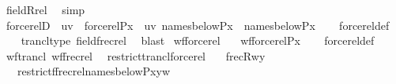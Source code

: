 \begin{isabellebody}
\ field{\isacharunderscore}{\kern0pt}Rrel\ \isamarkupfalse%
\ simp%
\endisatagproof
{\isafoldproof}%
%
\isadelimproof
\isanewline
%
\endisadelimproof
\isanewline
{}\isamarkupfalse%
\ forcerelD\ {\isacharcolon}{\kern0pt}\ {\isachardoublequoteopen}uv\ {\isasymin}\ forcerel{\isacharparenleft}{\kern0pt}P{\isacharcomma}{\kern0pt}x{\isacharparenright}{\kern0pt}\ {\isasymLongrightarrow}\ uv{\isasymin}\ names{\isacharunderscore}{\kern0pt}below{\isacharparenleft}{\kern0pt}P{\isacharcomma}{\kern0pt}x{\isacharparenright}{\kern0pt}\ {\isasymtimes}\ names{\isacharunderscore}{\kern0pt}below{\isacharparenleft}{\kern0pt}P{\isacharcomma}{\kern0pt}x{\isacharparenright}{\kern0pt}{\isachardoublequoteclose}\isanewline
%
\isadelimproof
\ \ %
\endisadelimproof
%
\isatagproof
{}\isamarkupfalse%
\ forcerel{\isacharunderscore}{\kern0pt}def\isanewline
\ \ \isamarkupfalse%
\ trancl{\isacharunderscore}{\kern0pt}type\ field{\isacharunderscore}{\kern0pt}frecrel\ \isamarkupfalse%
\ blast%
\endisatagproof
{\isafoldproof}%
%
\isadelimproof
\isanewline
%
\endisadelimproof
\isanewline
{}\isamarkupfalse%
\ wf{\isacharunderscore}{\kern0pt}forcerel\ {\isacharcolon}{\kern0pt}\isanewline
\ \ {\isachardoublequoteopen}wf{\isacharparenleft}{\kern0pt}forcerel{\isacharparenleft}{\kern0pt}P{\isacharcomma}{\kern0pt}x{\isacharparenright}{\kern0pt}{\isacharparenright}{\kern0pt}{\isachardoublequoteclose}\isanewline
%
\isadelimproof
\ \ %
\endisadelimproof
%
\isatagproof
{}\isamarkupfalse%
\ forcerel{\isacharunderscore}{\kern0pt}def\ \isamarkupfalse%
\ wf{\isacharunderscore}{\kern0pt}trancl\ wf{\isacharunderscore}{\kern0pt}frecrel\ \isacommand{{\isachardot}{\kern0pt}}\isamarkupfalse%
%
\endisatagproof
{\isafoldproof}%
%
\isadelimproof
\isanewline
%
\endisadelimproof
\isanewline
{}\isamarkupfalse%
\ restrict{\isacharunderscore}{\kern0pt}trancl{\isacharunderscore}{\kern0pt}forcerel{\isacharcolon}{\kern0pt}\isanewline
\ \ \ {\isachardoublequoteopen}frecR{\isacharparenleft}{\kern0pt}w{\isacharcomma}{\kern0pt}y{\isacharparenright}{\kern0pt}{\isachardoublequoteclose}\isanewline
\ \ \ {\isachardoublequoteopen}restrict{\isacharparenleft}{\kern0pt}f{\isacharcomma}{\kern0pt}frecrel{\isacharparenleft}{\kern0pt}names{\isacharunderscore}{\kern0pt}below{\isacharparenleft}{\kern0pt}P{\isacharcomma}{\kern0pt}x{\isacharparenright}{\kern0pt}{\isacharparenright}{\kern0pt}{\isacharminus}{\kern0pt}{\isacharbackquote}{\kern0pt}{\isacharbackquote}{\kern0pt}{\isacharbraceleft}{\kern0pt}y{\isacharbraceright}{\kern0pt}{\isacharparenright}{\kern0pt}{\isacharbackquote}{\kern0pt}w\isanewline

\end{isabellebody}
